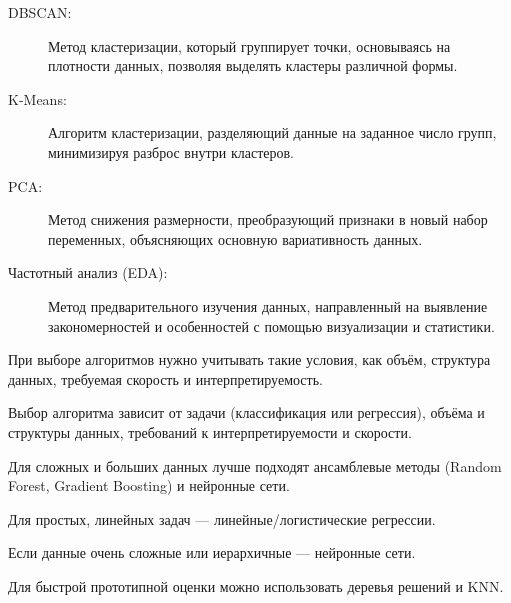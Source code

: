 \documentclass[14pt]{extarticle}
\begin{document}
\begin{description}
    \item[DBSCAN:] Метод кластеризации, который группирует точки, основываясь на плотности данных, позволяя выделять кластеры различной формы.
    
    \item[K-Means:] Алгоритм кластеризации, разделяющий данные на заданное число групп, минимизируя разброс внутри кластеров.
    
    \item[PCA:] Метод снижения размерности, преобразующий признаки в новый набор переменных, объясняющих основную вариативность данных.
    
    \item[Частотный анализ (EDA):] Метод предварительного изучения данных, направленный на выявление закономерностей и особенностей с помощью визуализации и статистики.
\end{description}

При выборе алгоритмов нужно учитывать такие условия, как объём, структура данных, требуемая скорость и интерпретируемость.

Выбор алгоритма зависит от задачи (классификация или регрессия), объёма и структуры данных, требований к интерпретируемости и скорости.

Для сложных и больших данных лучше подходят ансамблевые методы (Random Forest, Gradient Boosting) и нейронные сети.

Для простых, линейных задач — линейные/логистические регрессии.

Если данные очень сложные или иерархичные — нейронные сети.

Для быстрой прототипной оценки можно использовать деревья решений и KNN.
\end{document}

